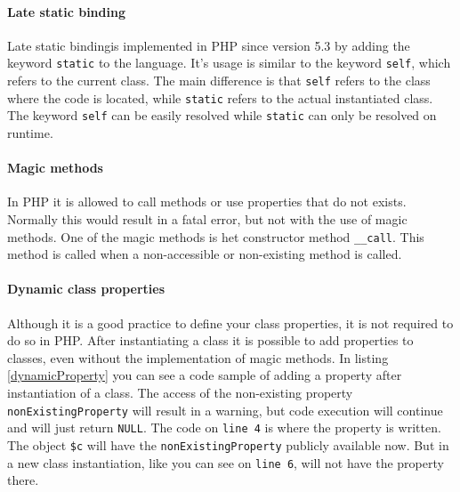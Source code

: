 \documentclass[../main.tex]{subfiles}
\begin{document}
    \paragraph{Late static binding}
    Late static binding\footnotemark is implemented in PHP since version 5.3 by adding the keyword \texttt{static} to the language.
    It's usage is similar to the keyword \texttt{self}, which refers to the current class. 
    The main difference is that \texttt{self} refers to the class where the code is located, while \texttt{static} refers to the actual instantiated class.
    The keyword \texttt{self} can be easily resolved while \texttt{static} can only be resolved on runtime.
    
    \paragraph{Magic methods}
    In PHP it is allowed to call methods or use properties that do not exists.
    Normally this would result in a fatal error, but not with the use of magic methods.
    One of the magic methods is het constructor method \texttt{\_\_{}call}.
    This method is called when a non-accessible or non-existing method is called.

    \paragraph{Dynamic class properties}
    Although it is a good practice to define your class properties, it is not required to do so in PHP.
    After instantiating a class it is possible to add properties to classes, even without the implementation of magic methods.
    In listing \ref{dynamicProperty} you can see a code sample of adding a property after instantiation of a class.
    The access of the non-existing property \texttt{nonExistingProperty} will result in a warning, but code execution will continue and will just return \texttt{NULL}.
    The code on \texttt{line 4} is where the property is written.
    The object \texttt{\$c} will have the \texttt{nonExistingProperty} publicly available now.
    But in a new class instantiation, like you can see on \texttt{line 6}, will not have the property there.
    
    
    
\end{document}
